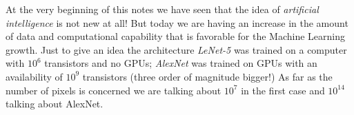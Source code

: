 At the very beginning of this notes we have seen that the idea of \textit{artificial intelligence} is not new at all! But today we are having an increase in the amount of data and computational capability that is favorable for the Machine Learning growth. Just to give an idea the architecture \textit{LeNet-5} was trained on a computer with $10^6$ transistors and no GPUs; \textit{AlexNet} was trained on GPUs with an availability of $10^9$ transistors (three order of magnitude bigger!) As far as the number of pixels is concerned we are talking about $10^7$ in the first case and $10^{14}$ talking about AlexNet.

